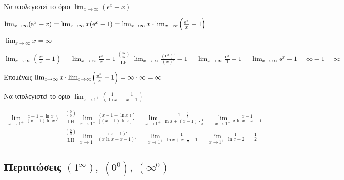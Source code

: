 \begin{example}
  Να υπολογιστεί το όριο $ \lim_{x \to \infty} (\mathrm{e}^{x} -x) $
\end{example}
\begin{solution}
  $ \lim_{x \to \infty} (\mathrm{e}^{x} - x) = \lim_{x \to \infty} x(\mathrm{e}^{x}
  - 1) = \lim_{x \to \infty} x \cdot \lim_{x \to \infty} \Bigl(\frac{\mathrm{e}^{x}}{x}
  -1\Bigr) $
  \begin{myitemize}
    \item $ \lim_{x \to \infty} x = \infty $
    \item $ \lim_{x \to \infty} \left(\frac{\mathrm{e}^{x}}{x} -1\right) = 
      \lim_{x \to \infty} \frac{\mathrm{e}^{x}}{x} -1
      \overset{\left(\frac{\infty}{\infty}\right)}{\underset{\mathrm{LH}}{=}} 
      \lim_{x \to \infty} \frac{(\mathrm{e}^{x} )'}{(x)'} -1 = \lim_{x \to \infty}
      \frac{\mathrm{e}^{x}}{1} -1 = \lim_{x \to \infty} \mathrm{e}^{x} -1 = \infty- 1 
      = \infty$
  \end{myitemize}
  Επομένως $ \lim_{x \to \infty} x \cdot \lim_{x \to \infty}
  \Bigl(\frac{\mathrm{e}^{x}}{x} -1 \Bigr) = \infty\cdot \infty = \infty$ 
\end{solution}

\begin{example}
  Να υπολογιστεί το όριο $ \lim_{x \to 1^{+}} \left(\frac{1}{\ln{x}} -
  \frac{1}{x-1}\right) $
\end{example}
\begin{solution}
  \begin{align*}
    \lim_{x \to 1^{+}} \frac{x-1- \ln{x}}{(x-1) \ln{x}})
    &\overset{\left(\frac{0}{0}\right)}{\underset{\mathrm{LH}}{=}} \lim_{x \to 1^{+}} 
    \frac{(x-1- \ln{x})'}{[(x-1) \ln{x}]'} = \lim_{x \to 1^{+}} \frac{1-
    \frac{1}{x}}{\ln{x} + (x-1) \cdot \frac{1}{x}} = \lim_{x \to 1^{+}} 
    \frac{x-1}{ x \ln{x} + x-1} \\
    &\overset{\left(\frac{0}{0}\right)}{\underset{\mathrm{LH}}{=}} \lim_{x \to 1^{+}} 
    \frac{(x-1)'}{(x \ln{x} +x-1)'} = \lim_{x \to 1^{+}} \frac{1}{\ln{x} +x \cdot
    \frac{1}{x}+1} = \lim_{x \to 1^{+}} \frac{1}{\ln{x}+2} = \frac{1}{2}
  \end{align*}
\end{solution}


\subsection*{Περιπτώσεις $ (1^{\infty}), \; (0^{0}), \; (\infty^{0}) $}


